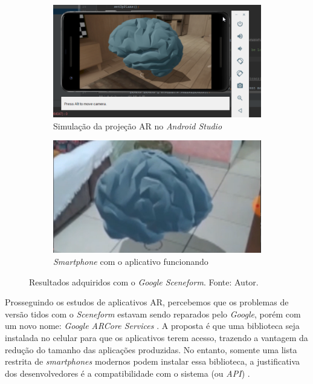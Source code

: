\begin{figure}[ht]
\centering
    \begin{subfigure}{0.45\textwidth}
        \centering
        \includegraphics[width=.95\textwidth]{figuras/sceneform.png}
        \caption{Simulação da projeção AR no \textit{Android Studio}}
        \label{fig:sceneform-sim}
    \end{subfigure}
    \begin{subfigure}{0.45\textwidth}
        \centering
        \includegraphics[width=.95\textwidth]{figuras/sceneformAR.png}
        \caption{\textit{Smartphone} com o aplicativo funcionando}
        \label{fig:sceneform-real}
    \end{subfigure}
    \caption{Resultados adquiridos com o \textit{Google Sceneform}. Fonte: Autor.}
    \label{fig:historico}
\end{figure}

Prosseguindo os estudos de aplicativos AR, percebemos que os problemas de versão tidos com o \textit{Sceneform} estavam sendo reparados pelo \textit{Google}, porém com um novo nome: \textit{Google ARCore Services} \cite{arcore-googleplay}. A proposta é que uma biblioteca seja instalada no celular para que os aplicativos terem acesso, trazendo a vantagem da redução do tamanho das aplicações produzidas. No entanto, somente uma lista restrita de \textit{smartphones} modernos podem instalar essa biblioteca, a justificativa dos desenvolvedores é a compatibilidade com o sistema (ou \textit{API}) \cite{arcore-list}.

